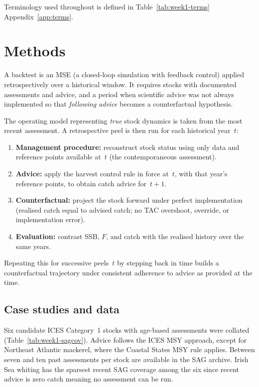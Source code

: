 \documentclass[11pt,a4paper]{extarticle}
\begin{document}
Terminology used throughout is defined in Table~\ref{tab:week1-terms} Appendix~\ref{app:terms}.

\section{Methods}
\label{sec:week1-methods}

A backtest is an MSE (a closed-loop simulation with feedback control) applied
retrospectively over a historical window. It requires stocks with documented
assessments and advice, and a period when scientific advice was not always
implemented so that \emph{following advice} becomes a counterfactual hypothesis.

The operating model representing \emph{true} stock dynamics is taken from the
most recent assessment. A retrospective peel is then run for each historical
year~\(t\):
\begin{enumerate}
	\item \textbf{Management procedure:} reconstruct stock status using only data
	and reference points available at~\(t\) (the contemporaneous assessment).
	\item \textbf{Advice:} apply the harvest control rule in force at~\(t\), with
	that year's reference points, to obtain catch advice for~\(t{+}1\).
	\item \textbf{Counterfactual:} project the stock forward under perfect
	implementation (realised catch equal to advised catch; no TAC overshoot,
	override, or implementation error).
	\item \textbf{Evaluation:} contrast SSB, \(F\), and catch with the realised
	history over the same years.
\end{enumerate}

Repeating this for successive peels~\(t\) by stepping back in time builds a counterfactual trajectory
under consistent adherence to advice as provided at the time.

\subsection{Case studies and data}

Six candidate ICES Category~1 stocks with age-based assessments were collated
(Table~\ref{tab:week1-sagcov}). Advice follows the ICES MSY approach, except
for Northeast Atlantic mackerel, where the Coastal States MSY rule applies.
Between seven and ten past assessments per stock are available in the SAG
archive. Irish Sea whiting has the sparsest recent SAG coverage among the six since recent advice is zero catch meaning no assessment can be run.
\end{document}
